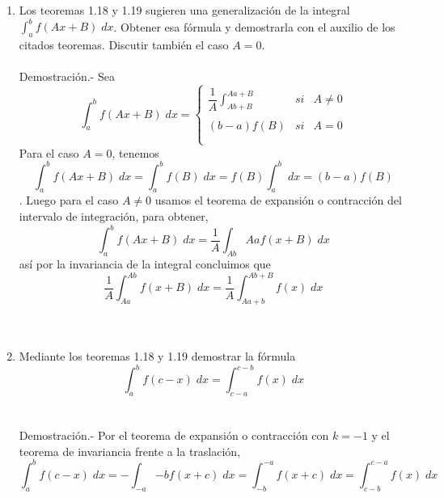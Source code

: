\begin{enumerate}
    \item Los teoremas 1.18 y 1.19 sugieren una generalización de la integral $\int_a^b f(Ax+B) \; dx$. Obtener esa fórmula y demostrarla con el auxilio de los citados teoremas. Discutir también el caso $A=0$.\\\\
	Demostración.-\; Sea 
	$$\int_a^b f(Ax+B)\;dx = \left\{ \begin{array}{rcl} 
	    \dfrac{1}{A}\displaystyle\int_{Ab+B}^{Aa+B}&si&A\neq 0\\\\
	    (b-a)f(B)&si&A = 0\\\\
	\end{array}\right.$$
	Para el caso $A=0$, tenemos $$\int_a^b f(Ax+B)\; dx = \int_{a}^b f(B)\; dx = f(B)\int_a^b \; dx = (b-a)f(B)$$.
	Luego para el caso $A\neq 0$ usamos el teorema de expansión o contracción del intervalo de integración, para obtener, 
	$$\int_a^b f(Ax+B)\; dx = \dfrac{1}{A}\int_{Ab}{Aa} f(x+B)\; dx$$
	así por la invariancia de la integral concluimos que 
	$$\dfrac{1}{A}\int_{Aa}^{Ab} f(x+B)\; dx = \dfrac{1}{A}\int_{Aa+b}^{Ab+B} f(x)\; dx$$\\\\

    \item Mediante los teoremas 1.18 y 1.19 demostrar la fórmula 
	$$\int_a^b f(c-x)\; dx = \int_{c-a}^{c-b}f(x) \; dx$$\\\\
	Demostración.-\; Por el teorema de expansión o contracción con $k=-1$ y el teorema de invariancia frente a la traslación, 
	$$\int_a^b f(c-x)\; dx = - \int_{-a}{-b} f(x+c)\; dx = \int_{-b}^{-a} f(x+c)\; dx = \int_{c-b}^{c-a} f(x) \; dx$$\\\\

\end{enumerate}
